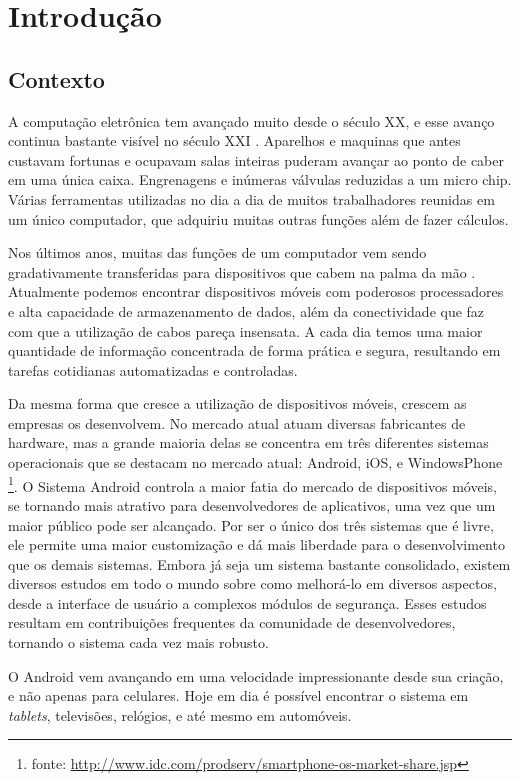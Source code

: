 \chapter{Introdução}
\section{Contexto}
A computação eletrônica tem avançado muito desde o século XX, e esse avanço continua bastante visível no século XXI \cite{histcomputacao2007}. Aparelhos e maquinas que antes custavam fortunas e ocupavam salas inteiras puderam avançar ao ponto de caber em uma única caixa. Engrenagens e inúmeras válvulas reduzidas a um micro chip. Várias ferramentas utilizadas no dia a dia de muitos trabalhadores reunidas em um único computador, que adquiriu muitas outras funções além de fazer cálculos.

Nos últimos anos, muitas das funções de um computador vem sendo gradativamente transferidas para dispositivos que cabem na palma da mão \cite{mobilemassmedia}. Atualmente podemos encontrar dispositivos móveis com poderosos processadores e alta capacidade de armazenamento de dados, além da conectividade que faz com que a utilização de cabos pareça insensata. A cada dia temos uma maior quantidade de informação concentrada de forma prática e segura, resultando em tarefas cotidianas automatizadas e controladas.

Da mesma forma que cresce a utilização de dispositivos móveis, crescem as empresas os desenvolvem. No mercado atual atuam diversas fabricantes de hardware, mas a grande maioria delas se concentra em três diferentes sistemas operacionais que se destacam no mercado atual: Android, iOS, e WindowsPhone \footnote{fonte: \url{http://www.idc.com/prodserv/smartphone-os-market-share.jsp}}. O Sistema Android controla a maior fatia do mercado de dispositivos móveis, se tornando mais atrativo para desenvolvedores de aplicativos, uma vez que um maior público pode ser alcançado. Por ser o único dos três sistemas que é livre, ele permite uma maior customização e dá mais liberdade para o desenvolvimento que os demais sistemas. Embora já seja um sistema bastante consolidado, existem diversos estudos em todo o mundo sobre como melhorá-lo em diversos aspectos, desde a interface de usuário a complexos módulos de segurança. Esses estudos resultam em contribuições frequentes da comunidade de desenvolvedores, tornando o sistema cada vez mais robusto.

O Android vem avançando em uma velocidade impressionante desde sua criação, e não apenas para celulares. Hoje em dia é possível encontrar o sistema em \textit{tablets}, televisões, relógios, e até mesmo em automóveis.

